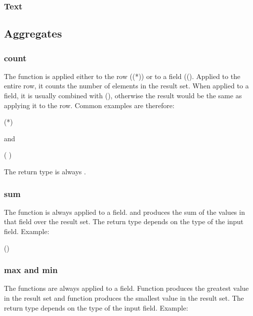 
\subsubsection{Text}

\subsection{Aggregates}\label{sec_agg}
\subsubsection{count}
The function is applied either to the row ((*))
or to a field (().
Applied to the entire row, it counts the number of elements
in the result set.
When applied to a field, it is usually combined with
 (),
otherwise the result would be the same as applying it to the row.
Common examples are therefore:

 (*)  

and

 ( )
 

The return type is always .


\subsubsection{sum}
The function is always applied to a field.
and produces the sum of the values in that field over the result set.
The return type depends on the type of the input field.
Example:

 ()  

\subsubsection{max and min}
The functions are always applied to a field.
Function  produces the greatest value in the result set
and function  produces the smallest value in the result set.
The return type depends on the type of the input field.
Example:

